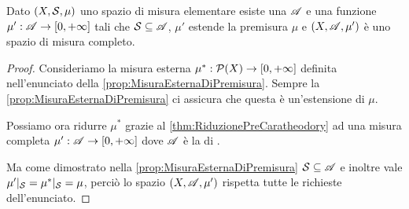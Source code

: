 \begin{theorem}\label{thm:EstensioneCaratheodory}
	Dato $(X,\S,\mu)$ uno spazio di misura elementare esiste una \sigalg{} $\A$ e una funzione $\mu':\A\to\Rpiu$ tali che $\S\subseteq \A$, $\mu'$ estende la premisura $\mu$ e $(X,\A,\mu')$ è uno spazio di misura completo.
\end{theorem}
\begin{proof}
	Consideriamo la misura esterna $\mu^*:\mathcal P(X)\to\Rpiu$ definita nell'enunciato della \cref{prop:MisuraEsternaDiPremisura}. Sempre la \cref{prop:MisuraEsternaDiPremisura} ci assicura che questa è un'estensione di $\mu$.
	
	Possiamo ora ridurre $\mu^*$ grazie al \cref{thm:RiduzionePreCaratheodory} ad una misura completa $\mu':\A\to\Rpiu$ dove $\A$ è la \sigalg{} di \carat{}. 
	
	Ma come dimostrato nella \cref{prop:MisuraEsternaDiPremisura} $\S\subseteq\A$ e inoltre vale $\mu'|_\S=\mu^*|_\S=\mu$, perciò lo spazio $(X,\A,\mu')$ rispetta tutte le richieste dell'enunciato.
\end{proof}


